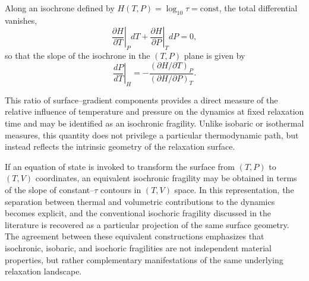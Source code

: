 Along an isochrone defined by $H(T,P)=\log_{10}\tau=\mathrm{const}$, the total differential vanishes,
\begin{equation}
	\left.
	\frac{\partial H}{\partial T}
	\right|_{P} dT
	+
	\left.
	\frac{\partial H}{\partial P}
	\right|_{T} dP
	=0,
\end{equation}
so that the slope of the isochrone in the $(T,P)$ plane is given by
\begin{equation}
	\label{eqn:isochronicSlope}
	\left.
	\frac{dP}{dT}
	\right|_{H}
	=
	-
	\frac{
		\left(\partial H/\partial T\right)_{P}
	}{
		\left(\partial H/\partial P\right)_{T}
	}.
\end{equation}

This ratio of surface–gradient components provides a direct measure of the relative influence of temperature and pressure on the dynamics at fixed relaxation time and may be identified as an isochronic fragility. Unlike isobaric or isothermal measures, this quantity does not privilege a particular thermodynamic path, but instead reflects the intrinsic geometry of the relaxation surface.

If an equation of state is invoked to transform the surface from $(T,P)$ to $(T,V)$ coordinates, an equivalent isochronic fragility may be obtained in terms of the slope of constant--$\tau$ contours in $(T,V)$ space. In this representation, the separation between thermal and volumetric contributions to the dynamics becomes explicit, and the conventional isochoric fragility discussed in the literature is recovered as a particular projection of the same surface geometry. The agreement between these equivalent constructions emphasizes that isochronic, isobaric, and isochoric fragilities are not independent material properties, but rather complementary manifestations of the same underlying relaxation landscape.
